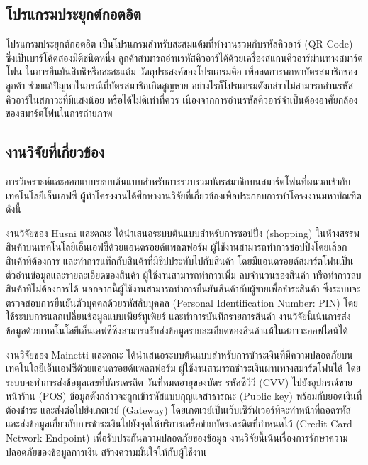 \documentclass[12pt,a4paper,twocolumn]{article}
\begin{document}
\subsection{โปรแกรมประยุกต์กอตอิต}
โปรแกรมประยุกต์กอตอิต เป็นโปรแกรมสำหรับสะสมแต้มที่ทำงานร่วมกับรหัสคิวอาร์ (QR Code) ซึ่งเป็นบาร์โค้ดสองมิติชนิดหนึ่ง ลูกค้าสามารถอ่านรหัสคิวอาร์ได้ด้วยเครื่องสแกนคิวอาร์ผ่านทางสมาร์ตโฟน ในการยืนยันสิทธิหรือสะสะแต้ม วัตถุประสงค์ของโปรแกรมคือ เพื่อลดการพกพาบัตรสมาชิกของลูกค้า ช่วยแก้ปัญหาในกรณีที่บัตรสมาชิกเกิดสูญหาย อย่างไรก็โปรแกรมดังกล่าวไม่สามารถอ่านรหัสคิวอาร์ในสภาวะที่มีแสงน้อย หรือได้ไม่ดีเท่าที่ควร เนื่องจากการอ่านรหัสคิวอาร์จำเป็นต้องอาศัยกล้องของสมาร์ตโฟนในการถ่ายภาพ

\subsection{งานวิจัยที่เกี่ยวข้อง}
การวิเคราะห์และออกแบบระบบต้นแบบสำหรับการรวบรวมบัตรสมาชิกบนสมาร์ตโฟนที่ผนวกเข้ากับเทคโนโลยีเอ็นเอฟซี ผู้ทำโครงงานได้ศึกษางานวิจัยที่เกี่ยวข้องเพื่อประกอบการทําโครงงานมหาบัณฑิต ดังนี้

งานวิจัยของ Husni และคณะ \cite{itm:shopping} ได้นำเสนอระบบต้นแบบสำหรับการชอปปิ้ง (shopping) ในห้างสรรพสินค้าบนเทคโนโลยีเอ็นเอฟซีด้วยแอนดรอยด์แพลตฟอร์ม ผู้ใช้งานสามารถทำการชอปปิ้งโดยเลือกสินค้าที่ต้องการ และทำการแท็กกับสินค้าที่มีชิปประทับไปกับสินค้า โดยมีแอนดรอยด์สมาร์ตโฟนเป็นตัวอ่านข้อมูลและรายละเอียดของสินค้า ผู้ใช้งานสามารถทำการเพิ่ม ลบจำนวนของสินค้า หรือทำการลบสินค้าที่ไม่ต้องการได้ นอกจากนี้ผู้ใช้งานสามารถทำการยืนยันสินค้ากับผู้ขายเพื่อชำระสินค้า ซึ่งระบบจะตรวจสอบการยืนยันตัวบุคคลด้วยรหัสลับบุคคล (Personal Identification Number: PIN) โดยใช้ระบบการแลกเปลี่ยนข้อมูลแบบเพียร์ทูเพียร์ และทำการบันทึกรายการสินค้า งานวิจัยนี้เน้นการส่งข้อมูลด้วยเทคโนโลยีเอ็นเอฟซีซึ่งสามารถรับส่งข้อมูลรายละเอียดของสินค้าแม้ในสภาวะออฟไลน์ได้

งานวิจัยของ Mainetti และคณะ \cite{itm:IDA-Pay} ได้นำเสนอระบบต้นแบบสำหรับการชำระเงินที่มีความปลอดภัยบนเทคโนโลยีเอ็นเอฟซีด้วยแอนดรอยด์แพลตฟอร์ม ผู้ใช้งานสามารถชำระเงินผ่านทางสมาร์ตโฟนได้ โดยระบบจะทำการส่งข้อมูลเลขที่บัตรเครดิต วันที่หมดอายุของบัตร รหัสซีวีวี (CVV) ไปยังอุปกรณ์ขายหน้าร้าน (POS) ข้อมูลดังกล่าวจะถูกเข้ารหัสแบบกุญแจสาธารณะ (Public key) พร้อมกับยอดเงินที่ต้องชำระ และส่งต่อไปยังเกตเวย์ (Gateway) โดยเกตเวย์เป็นเว็บเซิร์ฟเวอร์ที่จะทำหน้าที่ถอดรหัส และส่งข้อมูลเกี่ยวกับการชำระเงินไปยังจุดให้บริการเครือข่ายบัตรเครดิตที่กำหนดไว้ (Credit Card Network Endpoint) เพื่อรับประกันความปลอดภัยของข้อมูล งานวิจัยนี้เน้นเรื่องการรักษาความปลอดภัยของข้อมูลการเงิน สร้างความมั่นใจให้กับผู้ใช้งาน
\end{document}
